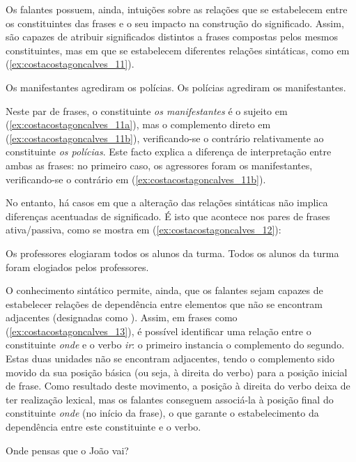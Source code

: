 \documentclass[output=paper]{LSP/langsci}
\begin{document}
Os falantes possuem, ainda, intuições sobre as relações que se estabelecem entre os constituintes das frases e o seu impacto na construção do significado. Assim, são capazes de atribuir significados distintos a frases compostas pelos mesmos constituintes, mas em que se estabelecem diferentes relações sintáticas, como em (\ref{ex:costacostagoncalves_11}).

\ea\label{ex:costacostagoncalves_11}
\ea\label{ex:costacostagoncalves_11a} Os manifestantes agrediram os polícias.
\ex\label{ex:costacostagoncalves_11b} Os polícias agrediram os manifestantes.
\zl

Neste par de frases, o constituinte \textit{os manifestantes} é o sujeito em (\ref{ex:costacostagoncalves_11a}), mas o complemento direto em (\ref{ex:costacostagoncalves_11b}), verificando-se o contrário relativamente ao constituinte \textit{os polícias}. Este facto explica a diferença de interpretação entre ambas as frases: no primeiro caso, os agressores foram os manifestantes, verificando-se o contrário em (\ref{ex:costacostagoncalves_11b}).

No entanto, há casos em que a alteração das relações sintáticas não implica diferenças acentuadas de significado. É isto que acontece nos pares de frases ativa/passiva, como se mostra em (\ref{ex:costacostagoncalves_12}):

\ea\label{ex:costacostagoncalves_12}
\ea\label{ex:costacostagoncalves_12a} Os professores elogiaram todos os alunos da turma.
\ex\label{ex:costacostagoncalves_12b} Todos os alunos da turma foram elogiados pelos professores.
\zl

	O conhecimento sintático permite, ainda, que os falantes sejam capazes de estabelecer relações de dependência entre elementos que não se encontram adjacentes (designadas como ). Assim, em frases como (\ref{ex:costacostagoncalves_13}), é possível identificar uma relação entre o constituinte \textit{onde} e o verbo \textit{ir}: o primeiro instancia o complemento do segundo. Estas duas unidades não se encontram adjacentes, tendo o complemento sido movido da sua posição básica (ou seja, à direita do verbo) para a posição inicial de frase. Como resultado deste movimento, a posição à direita do verbo deixa de ter realização lexical, mas os falantes conseguem associá-la à posição final do constituinte \textit{onde} (no início da frase), o que garante o estabelecimento da dependência entre este constituinte e o verbo. 
    
\ea\label{ex:costacostagoncalves_13} Onde pensas que o João vai?\z
\end{document}
